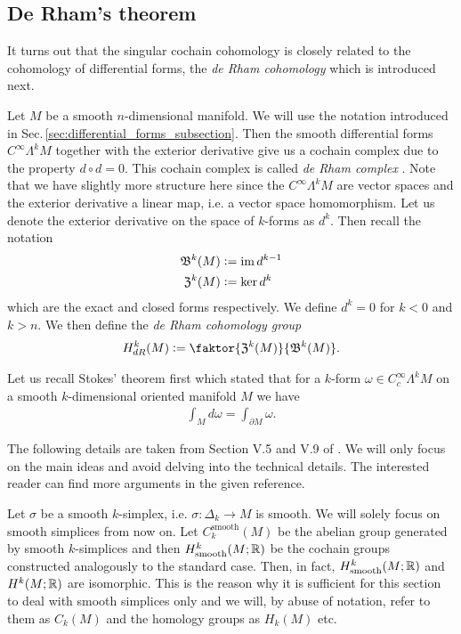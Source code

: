 \documentclass[../master_thesis.tex]{subfiles}
\begin{document}
\subsection{De Rham's theorem} \label{sec:de_rhams_theorem}

It turns out that the singular cochain cohomology is closely related to the cohomology 
of differential forms, the \textit{de Rham cohomology} which is introduced next. 

Let $M$ be a smooth $n$-dimensional manifold.
We will use the notation introduced in 
Sec.\,\ref{sec:differential_forms_subsection}. Then the smooth 
differential forms $C^\infty \Lambda^k M$ together 
with the exterior derivative give us a cochain complex due to the property $d \circ d = 0$. 
This cochain complex is called
\textit{de Rham complex} . 
Note that we have slightly more structure here
since the $C^\infty \Lambda^k M$ are vector spaces and the exterior
derivative a linear map, i.e. a vector space homomorphism.
Let us denote the exterior derivative on 
the space of $k$-forms as $d^k$. Then recall the notation
\begin{align*}
    \mathfrak{B}^k(M) &\vcentcolon= \operatorname{im} d^{k-1}
    \\ \mathfrak{Z}^k(M) &\vcentcolon= \ker d^k
\end{align*}
which are the exact and closed forms respectively.
We define $d^k = 0$ for $k < 0$ and $k>n$.
We then define the \textit{de Rham cohomology group} 
\begin{align*}
    H_{dR}^k(M) \vcentcolon= \faktor{\mathfrak{Z}^k(M)}{\mathfrak{B}^k(M)}.
\end{align*}

Let us recall Stokes' theorem first which stated 
that for a $k$-form $\omega \in C_c^\infty \Lambda^k M$ 
on a smooth $k$-dimensional oriented manifold $M$ we have 
\begin{align*}
    \int_M d\omega = \int_{\partial M} \omega.
\end{align*}

The following details are taken from Section V.5 and V.9 of 
\cite{topology_and_geometry}. We will only focus on the main ideas and avoid 
delving into the technical details. The interested reader can find more 
arguments in the given reference.

Let $\sigma$ be a smooth $k$-simplex, i.e. $\sigma: \Delta_k \rightarrow 
M$ is smooth. We will solely focus on smooth simplices from now on. Let 
$C_k^{\text{smooth}}(M)$ be the abelian group generated by smooth $k$-simplices and 
then $H^k_{\text{smooth}}(M;\mathbb{R})$ be the cochain groups constructed analogously to the 
standard case. Then, in fact, 
$H^k_{\text{smooth}}(M;\mathbb{R})$ and $H^k(M;\mathbb{R})$ are isomorphic. This 
is the reason why it is sufficient for this section to deal with smooth simplices 
only and we will, by abuse of notation, refer to them as $C_k(M)$
and the homology groups as $H_k(M)$ etc.
\end{document}
